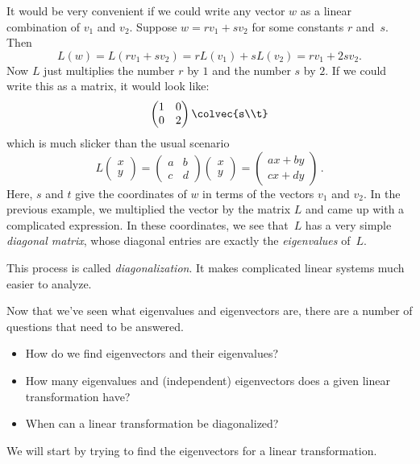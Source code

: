 It would be very convenient if we could write any vector $w$ as a linear combination of $v_1$ and $v_2$.  Suppose $w=rv_1+sv_2$ for some constants $r$ and~$s$.  Then
\[
L(w)=L(rv_1+sv_2)=rL(v_1)+sL(v_2)=rv_1+2sv_2.
\]
Now $L$ just multiplies the number $r$ by $1$ and the number $s$ by $2$.  If we could write this as a matrix, it would look like:
\[
\begin{pmatrix}
1 & 0 \\
0 & 2
\end{pmatrix}\colvec{s\\t}
\]
which is much slicker than the usual scenario  $$L\!\begin{pmatrix}
x\\
y
\end{pmatrix}\!=\!\begin{pmatrix}
\!a&b\! \\
\!c&d\!
\end{pmatrix} \! \!\begin{pmatrix}
x \\
y
\end{pmatrix}\!=\!
\begin{pmatrix}
\!ax+by\! \\
\!cx+dy\!
\end{pmatrix}\, .$$
Here, $s$ and $t$ give the coordinates of $w$ in terms of the vectors $v_1$ and $v_2$.  In the previous example, we multiplied the vector by the matrix $L$ and came up with a complicated expression.  In these coordinates, we see that~$L$ has a very simple \emph{diagonal matrix}, whose diagonal entries are exactly the \emph{eigenvalues} of~$L$.

This process is called \emph{diagonalization}. It makes complicated linear systems much easier to analyze.


Now that we've seen what eigenvalues and eigenvectors are, there are a number of questions that need to be answered.

\begin{itemize}
\item How do we find eigenvectors and their eigenvalues?
\item How many eigenvalues and (independent) eigenvectors does a given linear transformation have?
\item When can a linear transformation be diagonalized?
\end{itemize}
We will start by trying to find the eigenvectors for a linear transformation.

